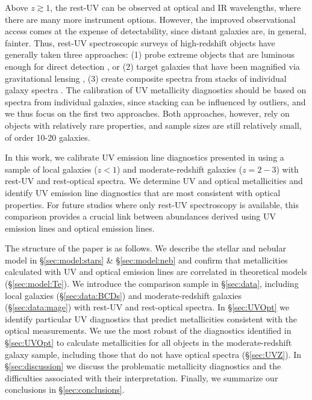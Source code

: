 \documentclass[preprint2]{aastex62}
\begin{document}
Above $z\gtrsim 1$, the rest-UV can be observed at optical and IR wavelengths, where there are many more instrument options. However, the improved observational access comes at the expense of detectability, since distant galaxies are, in general, fainter. Thus, rest-UV spectroscopic surveys of high-redshift objects have generally taken three approaches: (1) probe extreme objects that are luminous enough for direct detection \citep[e.g., ][]{Erb+2010, Stark+2014}, or (2) target galaxies that have been magnified via gravitational lensing \citep[e.g.,][]{Rigby+2018a}, (3) create composite spectra from stacks of individual galaxy spectra \citep[e.g.,][]{Shapley+2003, Steidel+2016}. The calibration of UV metallicity diagnostics should be based on spectra from individual galaxies, since stacking can be influenced by outliers, and we thus focus on the first two approaches. Both approaches, however, rely on objects with relatively rare properties, and sample sizes are still relatively small, of order 10-20 galaxies.

In this work, we calibrate UV emission line diagnostics presented in \citet{Byler+2018} using a sample of local galaxies ($z < 1$) and moderate-redshift galaxies ($z=2-3$) with rest-UV and rest-optical spectra.
We determine UV and optical metallicities and identify UV emission line diagnostics that are most consistent with optical properties. For future studies where only rest-UV spectroscopy is available, this comparison provides a crucial link between abundances derived using UV emission lines and optical emission lines.

The structure of the paper is as follows. We describe the stellar and nebular model in \S\ref{sec:model:stars} \& \S\ref{sec:model:neb} and confirm that metallicities calculated with UV and optical emission lines are correlated in theoretical models (\S\ref{sec:model:Te}). We introduce the comparison sample in \S\ref{sec:data}, including local galaxies (\S\ref{sec:data:BCDs}) and moderate-redshift galaxies (\S\ref{sec:data:mage}) with rest-UV and rest-optical spectra. In \S\ref{sec:UVOpt} we identify particular UV diagnostics that predict metallicities consistent with the optical measurements. We use the most robust of the diagnostics identified in \S\ref{sec:UVOpt} to calculate metallicities for all objects in the moderate-redshift galaxy sample, including those that do not have optical spectra (\S\ref{sec:UVZ}). In \S\ref{sec:discussion} we discuss the problematic metallicity diagnostics and the difficulties associated with their interpretation. Finally, we summarize our conclusions in \S\ref{sec:conclusions}.
\end{document}
